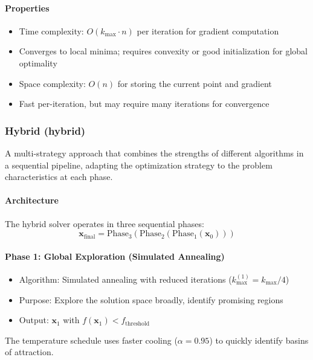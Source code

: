 \documentclass{report}
\begin{document}
\paragraph{Properties}
\begin{itemize}
\item Time complexity: $O(k_{\max} \cdot n)$ per iteration for gradient computation
\item Converges to local minima; requires convexity or good initialization for global optimality
\item Space complexity: $O(n)$ for storing the current point and gradient
\item Fast per-iteration, but may require many iterations for convergence
\end{itemize}

\subsubsection{Hybrid (hybrid)}
A multi-strategy approach that combines the strengths of different algorithms in a sequential pipeline, adapting the optimization strategy to the problem characteristics at each phase.

\paragraph{Architecture}
The hybrid solver operates in three sequential phases:
\begin{equation}
\mathbf{x}_{\text{final}} = \text{Phase}_3(\text{Phase}_2(\text{Phase}_1(\mathbf{x}_0)))
\end{equation}

\paragraph{Phase 1: Global Exploration (Simulated Annealing)}
\begin{itemize}
\item Algorithm: Simulated annealing with reduced iterations ($k_{\max}^{(1)} = k_{\max} / 4$)
\item Purpose: Explore the solution space broadly, identify promising regions
\item Output: $\mathbf{x}_1$ with $f(\mathbf{x}_1) < f_{\text{threshold}}$
\end{itemize}
The temperature schedule uses faster cooling ($\alpha = 0.95$) to quickly identify basins of attraction.
\end{document}
